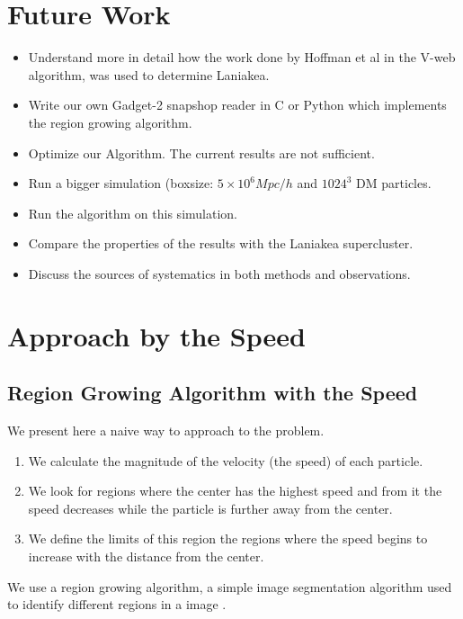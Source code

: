 \documentclass[12pt]{article}
\begin{document}
\section{Future Work}
\begin{itemize}
	\item Understand more in detail how the work done by Hoffman et al\cite{hoffman_kinematic_2012} in the V-web algorithm, was used to determine Laniakea.
    \item Write our own Gadget-2 snapshop reader in C or Python which implements the region growing algorithm.
    \item Optimize our Algorithm. The current results are not sufficient.
    \item Run a bigger simulation (boxsize: $5 \times 10^{6} Mpc/h$ and $1024^3$ DM particles.
    \item Run the algorithm on this simulation.
    \item Compare the properties of the results with the Laniakea supercluster.
    \item Discuss the sources of systematics in both methods and observations.
\end{itemize}






\appendix
\section{Approach by the Speed} \label{App:App_Speed}
\subsection{Region Growing Algorithm with the Speed}

We present here a naive way to approach to the problem. 
\begin{enumerate}
	\item We calculate the magnitude of the velocity (the speed) of each particle. 
	\item We look for regions where the center has the highest speed and from it the speed decreases while the particle is further away from the center. 
    \item We define the limits of this region the regions where the speed begins to increase with the distance from the center.
\end{enumerate}

\begin{par}
We use a region growing algorithm, a simple image segmentation algorithm
used to identify different regions in a image \cite{gonzalez_digital_2008}.
\end{par}
\end{document}
